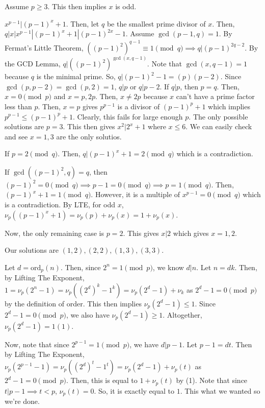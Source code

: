 \documentclass[11pt]{article}
\begin{document}

\begin{sol}
Assume $p\ge 3$. This then implies $x$ is odd.

$x^{p-1}|(p-1)^{x}+1$. Then, let $q$ be the smallest prime divisor of $x$. Then, $q|x|x^{p-1}|(p-1)^{x}+1|(p-1)^{2x}-1$. Assume $\gcd(p-1,q)=1$. By Fermat's Little Theorem, $((p-1)^2)^{q-1}\equiv 1\pmod{q}\implies q|(p-1)^{2q-2}$. By the GCD Lemma, $q|((p-1)^2)^{\gcd(x,q-1)}$. Note that $\gcd(x,q-1)=1$ because $q$ is the minimal prime. So, $q|(p-1)^2-1=(p)(p-2)$. Since $\gcd(p,p-2)=\gcd(p,2)=1$, $q|p$ or $q|p-2$.  If $q|p$, then $p=q$. Then, $x=0\pmod{p}$ and $x=p,2p$. Then, $x\neq 2p$ because $x$ can't have a prime factor less than $p$. Then, $x=p$ gives $p^{p-1}$ is a divisor of $(p-1)^{p}+1$ which implies $p^{p-1}\leq (p-1)^{p}+1$. Clearly, this fails for large enough $p$. The only possible solutions are $p=3$.  This then gives $x^2|2^{x}+1$ where $x\leq 6$. We can easily check and see $x=1,3$ are the only solutios.

If $p=2\pmod{q}$. Then, $q|(p-1)^{x}+1=2\pmod{q}$ which is a contradiction.

If $\gcd((p-1)^2,q)=q$, then$(p-1)^2=0\pmod{q}\implies p-1=0\pmod{q}\implies p=1\pmod{q}$. Then, $(p-1)^{x}+1=1\pmod{q}$. However, it is a multiple of $x^{p-1}=0\pmod{q}$ which is a contradiction.
By LTE, for odd $x$, $\nu_{p}((p-1)^{x}+1)=\nu_{p}(p)+\nu_{p}(x)=1+\nu_{p}(x)$.


Now, the only remaining case is $p=2$. This gives $x|2$ which gives $x=1,2$.

Our solutions are $\boxed{(1,2),(2,2),(1,3),(3,3)}$. 
\end{sol}


\begin{sol}
Let $d=\text{ord}_{p}(n)$. Then, since $2^{n}=1\pmod{p}$, we know $d|n$. Let $n=dk$. Then, by Lifting The Exponent, $1=\nu_{p}(2^{n}-1)=\nu_{p}((2^{d})^{k}-1^{k})=\nu_{p}(2^{d}-1)+\nu_{k}$ as $2^{d}-1=0\pmod{p}$ by the definition of order. This then implies $\nu_{p}(2^{d}-1)\leq 1$. Since $2^{d}-1=0\pmod{p}$, we also have $\nu_{p}(2^{d}-1)\ge 1$. Altogether, $\nu_{p} (2^{d}-1)=1 (1)$.

Now, note that since $2^{p-1}=1\pmod{p}$, we have $d|p-1$. Let $p-1=dt$. Then by Lifting The Exponent, $\nu_{p}(2^{p-1}-1)=\nu_{p}((2^{d})^{t}-1^{t})=\nu_{p}(2^{d}-1) +\nu_{p}(t)$ as $2^{d}-1=0\pmod{p}$. Then, this is equal to $1+\nu_{p}(t)$ by (1). Note that since $t|p-1\implies t<p$, $\nu_{p}(t)=0$. So, it is exactly equal to $1$. This what we wanted so we're done.
\end{sol}
\end{document}
